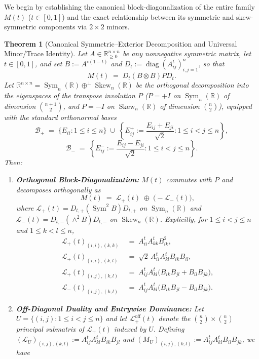 \documentclass[11pt,a4paper]{article}
\theoremstyle{plain}
\newtheorem{theorem}{Theorem}[section]
\theoremstyle{definition}
\theoremstyle{remark}
\DeclareMathOperator{\Sym}{Sym}
\DeclareMathOperator{\Skew}{Skew}
\DeclareMathOperator{\diag}{diag}
\begin{document}
We begin by establishing the canonical block-diagonalization of the entire family $M(t)$ ($t \in [0,1]$) and the exact relationship between its symmetric and skew-symmetric components via $2 \times 2$ minors.

\begin{theorem}[Canonical Symmetric--Exterior Decomposition and Universal Minor/Trace Identity]\label{thm:decomp}
Let $A \in \mathbb{R}_{\ge 0}^{n \times n}$ be any nonnegative symmetric matrix, let $t \in [0,1]$, and set $B := A^{\circ(1-t)}$ and $D_t := \diag(A_{ij}^t)_{i,j=1}^n$, so that
\[
  M(t) \;=\; D_t (B \otimes B) P D_t.
\]
Let $\mathbb{R}^{n \times n} = \Sym_n(\mathbb{R}) \oplus^{\perp} \Skew_n(\mathbb{R})$ be the orthogonal decomposition into the eigenspaces of the transpose involution $P$ ($P = +I$ on $\Sym_n(\mathbb{R})$ of dimension $\binom{n+1}{2}$, and $P = -I$ on $\Skew_n(\mathbb{R})$ of dimension $\binom{n}{2}$), equipped with the standard orthonormal bases
\[
  \mathcal{B}_+ \;=\; \{E_{ii} : 1 \le i \le n\} \;\cup\; \left\{E_{ij}^+ := \frac{E_{ij} + E_{ji}}{\sqrt{2}} : 1 \le i < j \le n\right\},
\]
\[
  \mathcal{B}_- \;=\; \left\{E_{ij}^- := \frac{E_{ij} - E_{ji}}{\sqrt{2}} : 1 \le i < j \le n\right\}.
\]
Then:
\begin{enumerate}[label=(\alph*)]
  \item \textbf{Orthogonal Block-Diagonalization:} $M(t)$ commutes with $P$ and decomposes orthogonally as
  \begin{equation}\label{eq:block_decomp}
    M(t) \;=\; \mathcal{L}_+(t) \;\oplus\; \big(-\mathcal{L}_-(t)\big),
  \end{equation}
  where $\mathcal{L}_+(t) = D_{t,+} (\Sym^2 B) D_{t,+}$ on $\Sym_n(\mathbb{R})$ and $\mathcal{L}_-(t) = D_{t,-} (\wedge^2 B) D_{t,-}$ on $\Skew_n(\mathbb{R})$. Explicitly, for $1 \le i < j \le n$ and $1 \le k < l \le n$,
  \begin{align}
    \mathcal{L}_+(t)_{(i,i),(k,k)} &\;=\; A_{ii}^t A_{kk}^t B_{ik}^2, \label{eq:Lplus_diag}\\
    \mathcal{L}_+(t)_{(i,i),(k,l)} &\;=\; \sqrt{2}\, A_{ii}^t A_{kl}^t B_{ik} B_{il}, \label{eq:Lplus_cross}\\
    \mathcal{L}_+(t)_{(i,j),(k,l)} &\;=\; A_{ij}^t A_{kl}^t \big(B_{ik}B_{jl} + B_{il}B_{jk}\big), \label{eq:Lplus_off}\\
    \mathcal{L}_-(t)_{(i,j),(k,l)} &\;=\; A_{ij}^t A_{kl}^t \big(B_{ik}B_{jl} - B_{il}B_{jk}\big). \label{eq:Lminus_off}
  \end{align}
  \item \textbf{Off-Diagonal Duality and Entrywise Dominance:} Let $U = \{(i,j) : 1 \le i < j \le n\}$ and let $\mathcal{L}_+^{\mathrm{off}}(t)$ denote the $\binom{n}{2} \times \binom{n}{2}$ principal submatrix of $\mathcal{L}_+(t)$ indexed by $U$. Defining $(\mathcal{L}_U)_{(i,j),(k,l)} := A_{ij}^t A_{kl}^t B_{ik}B_{jl}$ and $(M_U)_{(i,j),(k,l)} := A_{ij}^t A_{kl}^t B_{il}B_{jk}$, we have

\end{enumerate}
\end{theorem}
\end{document}
